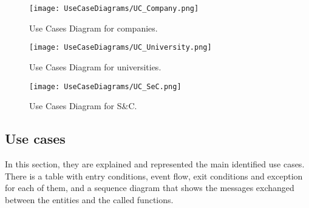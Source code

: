 \begin{figure}[H]
    \begin{center}
        \texttt{[image: UseCaseDiagrams/UC\_Company.png]}
        \caption{Use Cases Diagram for companies.} 
        \label{fig:CompanyUC}%
    \end{center}
\end{figure}

\begin{figure}[H]
    \begin{center}
        \texttt{[image: UseCaseDiagrams/UC\_University.png]}
        \caption{Use Cases Diagram for universities.} 
        \label{fig:UniversityUC}%
    \end{center}
\end{figure}

\begin{figure}[H]
    \begin{center}
        \texttt{[image: UseCaseDiagrams/UC\_SeC.png]}
        \caption{Use Cases Diagram for S\&C.} 
        \label{fig:SeCUC}%
    \end{center}
\end{figure}

\newpage
\subsection{Use cases}
\label{subsec: use_cases}%
\setcounter{uc}{1}
\newcommand{\cuc}{\theuc\stepcounter{uc}}
In this section, they are explained and represented the main identified use cases.\\
There is a table with entry conditions, event flow, exit conditions and exception for each of them, and a sequence diagram that shows the messages exchanged between the entities and the called functions. \\


